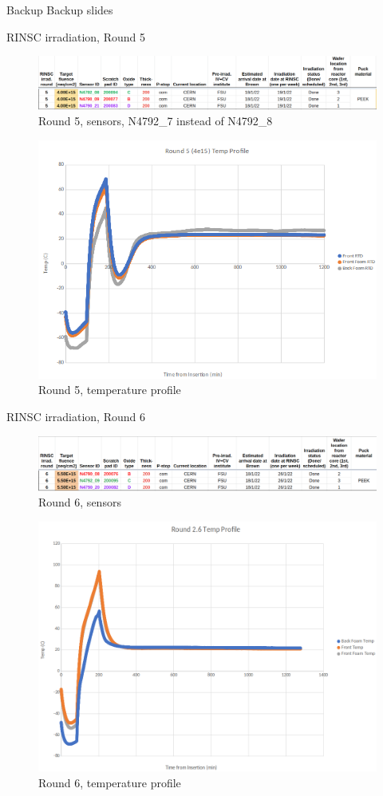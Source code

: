 \documentclass{beamer}
\begin{document}
\appendix

\begin{frame}{Backup}
	\center
	\huge
	Backup slides
\end{frame}




\begin{frame}{RINSC irradiation, Round 5}
    \begin{figure}
        \includegraphics[width=.7\textwidth]{plots/Round_5_sensors.png}
        \caption{Round 5, sensors, N4792\_7 instead of N4792\_8}
    \end{figure}
    \begin{figure}
      \includegraphics[width=.5\textwidth]{plots/Round5_temp_profile.png}
      \caption{Round 5, temperature profile}
    \end{figure}
\end{frame}

\begin{frame}{RINSC irradiation, Round 6}
    \begin{figure}
        \includegraphics[width=.7\textwidth]{plots/Round_6_sensors.png}
        \caption{Round 6, sensors}
    \end{figure}
    \begin{figure}
      \includegraphics[width=.5\textwidth]{plots/Round6_temp_profile.png}
      \caption{Round 6, temperature profile}
    \end{figure}
\end{frame}
\end{document}
